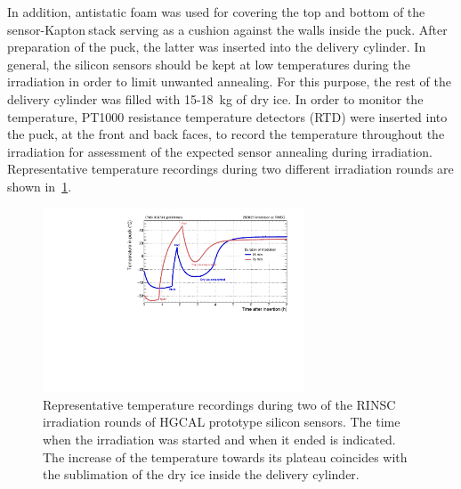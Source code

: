 In addition, antistatic foam was used for covering the top and bottom of the sensor-Kapton\texttrademark$~$stack serving as a cushion  against the walls inside the puck.
After preparation of the puck, the latter was inserted into the delivery cylinder.
In general, the silicon sensors should be kept at low temperatures during the irradiation in order to limit unwanted annealing.
For this purpose, the rest of the delivery cylinder was filled with 15-\SI{18}{\kilo\gram} of dry ice.
In order to monitor the temperature, PT1000 resistance temperature detectors (RTD) were inserted into the puck, at the front and back faces, to record the temperature throughout the irradiation for assessment of the expected sensor annealing during irradiation. 
Representative temperature recordings during two different irradiation rounds are shown in~\ref{fig:Round_10_Temperature_Profile}.
\begin{figure}[!hbt]
  \begin{center}
    \includegraphics[width=0.69\textwidth]{plots/RINSC_temp/RINSC_temp.pdf}
    \caption{Representative temperature recordings during two of the RINSC irradiation rounds of HGCAL prototype silicon sensors. 
    The time when the irradiation was started and when it ended is indicated.
    The increase of the temperature towards its plateau coincides with the sublimation of the dry ice inside the delivery cylinder.
    }
    \label{fig:Round_10_Temperature_Profile}
  \end{center}
\end{figure}
